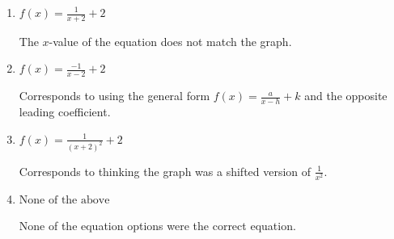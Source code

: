 \documentclass{extbook}[14pt]
\begin{document}
\begin{enumerate}
{\begin{enumerate}[label=\Alph*.]
Corresponds to thinking the graph was a shifted version of $\frac{1}{x^2}$, using the general form $f(x) = \frac{a}{x-h}+k$, and the opposite leading coefficient.
\item \( f(x) = \frac{1}{x + 2} + 2 \)

The $x$-value of the equation does not match the graph.
\item \( f(x) = \frac{-1}{x - 2} + 2 \)

Corresponds to using the general form $f(x) = \frac{a}{x-h}+k$ and the opposite leading coefficient.
\item \( f(x) = \frac{1}{(x + 2)^2} + 2 \)

Corresponds to thinking the graph was a shifted version of $\frac{1}{x^2}$.
\item \( \text{None of the above} \)

None of the equation options were the correct equation.
\end{enumerate}

}
\end{enumerate}
\end{document}

